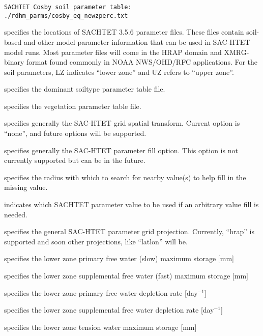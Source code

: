  \begin{Verbatim}[frame=single]
SACHTET Cosby soil parameter table:  ./rdhm_parms/cosby_eq_newzperc.txt
 \end{Verbatim}

 
  specifies the locations of SACHTET 3.5.6 
 parameter files.  These files contain soil-based and other model
 parameter information that can be used in SAC-HTET model runs.
 Most parameter files will come in the HRAP domain and XMRG-binary format
 found commonly in NOAA NWS/OHD/RFC applications.
 For the soil parameters, LZ indicates ``lower zone'' and UZ refers to ``upper zone''.

  specifies the 
 dominant soiltype parameter table file.

  specifies the
 vegetation parameter table file. 

  specifies generally the SAC-HTET
  grid spatial transform.  Current option is ``none'', and future options
  will be supported.

  specifies generally the SAC-HTET
  parameter fill option.  This option is not currently supported but
 can be in the future.

  specifies the radius with which
 to search for nearby value(s) to help fill in the missing value.

  indicates which SACHTET parameter 
 value to be used if an arbitrary value fill is needed. 

  specifies the general SAC-HTET parameter
  grid projection.  Currently, ``hrap'' is supported and soon other projections,
  like ``latlon'' will be.

  specifies the
 lower zone primary free water (slow) maximum storage [mm]

  specifies the
 lower zone supplemental free water (fast) maximum storage [mm]

  specifies the
 lower zone primary free water depletion rate [day$^{-1}$]

  specifies the
 lower zone supplemental free water depletion rate [day$^{-1}$]

  specifies the
 lower zone tension water maximum storage [mm]

